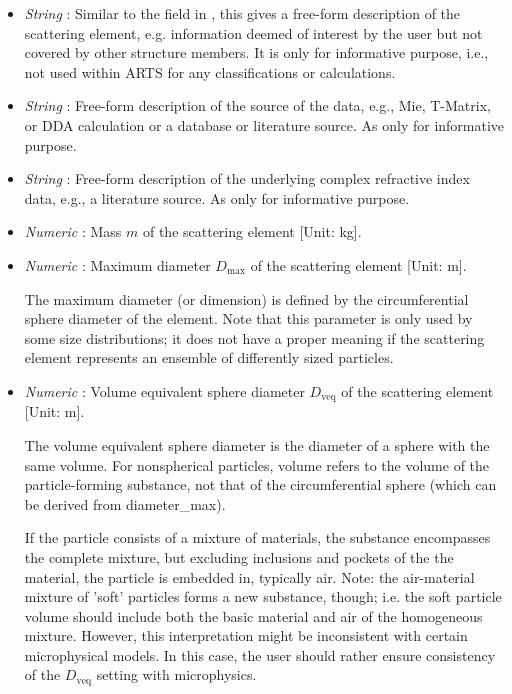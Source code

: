 \begin{itemize}
\item  {\sl String} :
  Similar to the  field in , this
  gives a free-form description of the scattering element, e.g. information
  deemed of interest by the user but not covered by other structure members. It
  is only for informative purpose, i.e., not used within ARTS for any
  classifications or calculations.

\item  {\sl String} :
  Free-form description of the source of the data, e.g., Mie, T-Matrix, or DDA
  calculation or a database or literature source. As 
  only for informative purpose.

\item  {\sl String} :
  Free-form description of the underlying complex refractive index data, e.g., a
literature source. As  only for informative purpose.

\item  {\sl Numeric} :
  Mass $m$ of the scattering element [Unit: kg].

\item  {\sl Numeric} :
  Maximum diameter $D_\mathrm{max}$ of the scattering element [Unit: m].

  The maximum diameter (or dimension) is defined by the circumferential sphere
  diameter of the element. Note that this parameter is only used by some size
  distributions; it does not have a proper meaning if the scattering element
  represents an ensemble of differently sized particles.

\item  {\sl Numeric} :
  Volume equivalent sphere diameter $D_\mathrm{veq}$ of the scattering element
  [Unit: m].

  The volume equivalent sphere diameter is the diameter of a sphere with the
same volume. For nonspherical particles, volume refers to the volume of the
particle-forming substance, not that of the circumferential sphere (which can be
derived from diameter\_max).

If the particle consists of a mixture of materials,
the substance encompasses the complete mixture, but excluding inclusions and
pockets of the the material, the particle is embedded in, typically air. Note: 
the air-material mixture of 'soft' particles forms a new substance, though; i.e.
the soft particle volume should include both the basic material and air of the
homogeneous mixture. However, this interpretation might be inconsistent with
certain microphysical models. In this case, the user should rather ensure
consistency of the $D_\mathrm{veq}$ setting with microphysics.


\end{itemize}
